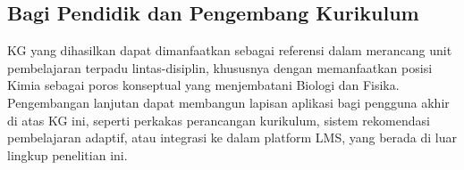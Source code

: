 \documentclass[../../thesis]{subfiles}
\begin{document}
\subsection{Bagi Pendidik dan Pengembang Kurikulum}

KG yang dihasilkan dapat dimanfaatkan sebagai referensi dalam merancang unit
pembelajaran terpadu lintas-disiplin, khususnya dengan memanfaatkan posisi Kimia
sebagai poros konseptual yang menjembatani Biologi dan Fisika. Pengembangan
lanjutan dapat membangun lapisan aplikasi bagi pengguna akhir di atas KG ini,
seperti perkakas perancangan kurikulum, sistem rekomendasi pembelajaran adaptif,
atau integrasi ke dalam platform LMS, yang berada di luar lingkup penelitian ini.

\ifSubfilesClassLoaded{\printbibliography[title={Daftar Pustaka}]}{}
\end{document}
